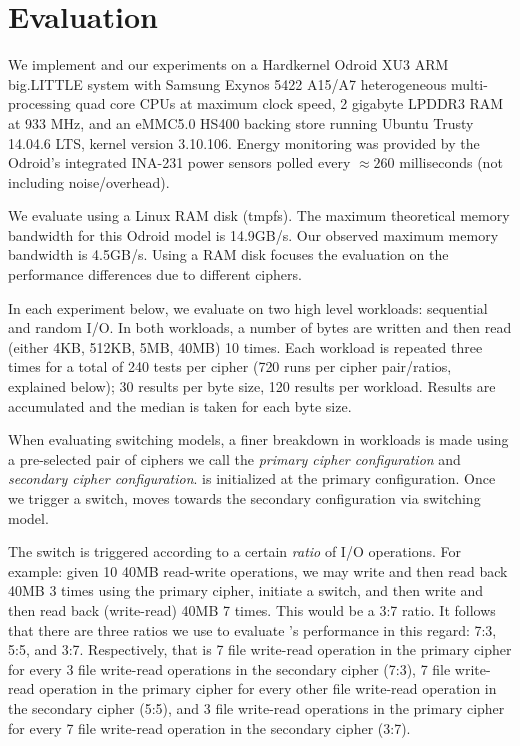 \section{Evaluation}\label{sec:eval}

We implement \sys and our experiments on a Hardkernel Odroid XU3 ARM big.LITTLE
system with Samsung Exynos 5422 A15/A7 heterogeneous multi-processing quad core
CPUs at maximum clock speed, 2 gigabyte LPDDR3 RAM at 933 MHz, and an eMMC5.0
HS400 backing store running Ubuntu Trusty 14.04.6 LTS, kernel version 3.10.106.
Energy monitoring was provided by the Odroid's integrated INA-231 power sensors
polled every $\approx{260}$ milliseconds (not including noise/overhead).

We evaluate \sys using a Linux RAM disk (tmpfs). The maximum theoretical memory
bandwidth for this Odroid model is 14.9GB/s\@. Our observed maximum memory
bandwidth is 4.5GB/s. Using a RAM disk focuses the evaluation on the performance
differences due to different ciphers.

In each experiment below, we evaluate \sys on two high level workloads:
sequential and random I/O. In both workloads, a number of bytes are written and
then read (either 4KB, 512KB, 5MB, 40MB) 10 times. Each workload is repeated
three times for a total of 240 tests per cipher (720 runs per cipher
pair/ratios, explained below); 30 results per byte size, 120 results per
workload. Results are accumulated and the median is taken for each byte size.

When evaluating switching models, a finer breakdown in workloads is made using a
pre-selected pair of ciphers we call the {\em primary cipher configuration} and
{\em secondary cipher configuration}. \sys is initialized at the primary
configuration. Once we trigger a switch, \sys moves towards the secondary
configuration via switching model.

The switch is triggered according to a certain {\em ratio} of I/O operations.
For example: given 10 40MB read-write operations, we may write and then read
back 40MB 3 times using the primary cipher, initiate a switch, and then write
and then read back (write-read) 40MB 7 times. This would be a 3:7 ratio. It
follows that there are three ratios we use to evaluate \sys's performance in
this regard: 7:3, 5:5, and 3:7. Respectively, that is 7 file write-read
operation in the primary cipher for every 3 file write-read operations in the
secondary cipher (7:3), 7 file write-read operation in the primary cipher for
every other file write-read operation in the secondary cipher (5:5), and 3 file
write-read operations in the primary cipher for every 7 file write-read
operation in the secondary cipher (3:7).

